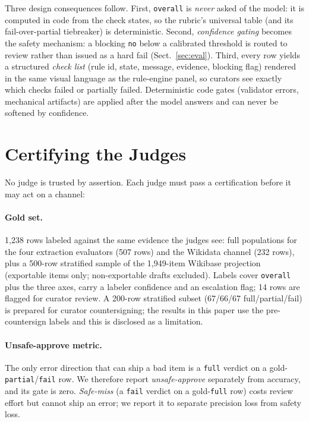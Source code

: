 \documentclass{llncs}
\begin{document}
Three design consequences follow. First, \texttt{overall} is \emph{never}
asked of the model: it is computed in code from the check states, so the
rubric's universal table (and its fail-over-partial tiebreaker) is
deterministic. Second, \emph{confidence gating} becomes the safety
mechanism: a blocking \texttt{no} below a calibrated threshold is routed
to review rather than issued as a hard fail (Sect.~\ref{sec:eval}).
Third, every row yields a structured \emph{check list}
(rule id, state, message, evidence, blocking flag) rendered in the same
visual language as the rule-engine panel, so curators see exactly which
checks failed or partially failed. Deterministic code gates (validator
errors, mechanical artifacts) are applied after the model answers and can
never be softened by confidence.

\section{Certifying the Judges}
\label{sec:cert}

No judge is trusted by assertion. Each judge must pass a certification
before it may act on a channel:

\paragraph{Gold set.}
1{,}238 rows labeled against the same evidence the judges see: full
populations for the four extraction evaluators (507 rows) and the Wikidata
channel (232 rows), plus a 500-row stratified sample of the 1{,}949-item
Wikibase projection (exportable items only; non-exportable drafts
excluded). Labels cover \texttt{overall} plus the three axes, carry a
labeler confidence and an escalation flag; 14 rows are flagged for curator
review. A 200-row stratified subset (67/66/67 full/partial/fail) is
prepared for curator countersigning; the results in this paper use the
pre-countersign labels and this is disclosed as a limitation.

\paragraph{Unsafe-approve metric.}
The only error direction that can ship a bad item is a \texttt{full}
verdict on a gold-\texttt{partial}/\texttt{fail} row. We therefore report
\emph{unsafe-approve} separately from accuracy, and its gate is zero.
\emph{Safe-miss} (a \texttt{fail} verdict on a gold-\texttt{full} row)
costs review effort but cannot ship an error; we report it to separate
precision loss from safety loss.
\end{document}

